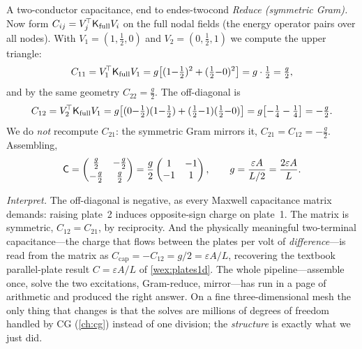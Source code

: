 \begin{workedexample}{A two-conductor capacitance, end to end}{es-twocond}
\medskip
\emph{Reduce (symmetric Gram).} Now form $C_{ij}=V_j^{\!\top}\mathsf{K}_{\text{full}}V_i$
on the full nodal fields (the energy operator pairs over all nodes). With
$V_1=(1,\tfrac12,0)$ and $V_2=(0,\tfrac12,1)$ we compute the upper triangle:
\[
  C_{11}=V_1^{\!\top}\mathsf{K}_{\text{full}}V_1
       = g\!\left[(1{-}\tfrac12)^2+(\tfrac12{-}0)^2\right] = g\cdot\tfrac12 = \tfrac{g}{2},
\]
and by the same geometry $C_{22}=\tfrac{g}{2}$. The off-diagonal is
\[
  C_{12}=V_2^{\!\top}\mathsf{K}_{\text{full}}V_1
       = g\bigl[(0{-}\tfrac12)(1{-}\tfrac12)+(\tfrac12{-}1)(\tfrac12{-}0)\bigr]
       = g\bigl[-\tfrac14-\tfrac14\bigr] = -\tfrac{g}{2}.
\]
We do \emph{not} recompute $C_{21}$: the symmetric Gram mirrors it,
$C_{21}=C_{12}=-\tfrac{g}{2}$. Assembling,
\[
  \mathsf{C} =
  \begin{pmatrix} \tfrac{g}{2} & -\tfrac{g}{2} \\[2pt] -\tfrac{g}{2} & \tfrac{g}{2} \end{pmatrix}
  = \frac{g}{2}\begin{pmatrix} 1 & -1 \\ -1 & 1 \end{pmatrix},
  \qquad g=\frac{\varepsilon A}{L/2}=\frac{2\varepsilon A}{L}.
\]

\medskip
\emph{Interpret.} The off-diagonal is negative, as every Maxwell capacitance matrix
demands: raising plate~2 induces opposite-sign charge on plate~1. The matrix is
symmetric, $C_{12}=C_{21}$, by reciprocity. And the physically meaningful
two-terminal capacitance---the charge that flows between the plates per volt of
\emph{difference}---is read from the matrix as $C_{\text{cap}}=-C_{12}=g/2=\varepsilon
A/L$, recovering the textbook parallel-plate result $C=\varepsilon A/L$ of
\cref{wex:plates1d}. The whole pipeline---assemble once, solve the two excitations,
Gram-reduce, mirror---has run in a page of arithmetic and produced the right answer.
On a fine three-dimensional mesh the only thing that changes is that the solves are
millions of degrees of freedom handled by CG (\cref{ch:cg}) instead of one division;
the \emph{structure} is exactly what we just did.
\end{workedexample}

